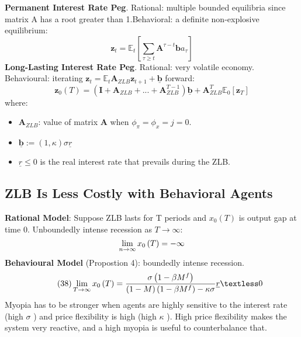 \documentclass{beamer}
\begin{document}
\begin{frame}{\subsecname}
    \textbf{Permanent Interest Rate Peg}. Rational: multiple bounded equilibria since matrix A has a root greater than 1.Behavioral: a definite non-explosive equilibrium:
    \begin{equation}
        \textbf{z}_{t}=\mathbb{E}_{t}\left[\sum_{\tau \geq t}\textbf{A}^{\tau-t}\textbf{b}a_{\tau}\right]
    \end{equation}
    \textbf{Long-Lasting Interest Rate Peg}. Rational: very volatile economy. Behavioural: iterating $\textbf{z}_{t}=\mathbb{E}_{t}\textbf{A}_{ZLB}\textbf{z}_{t+1}+\underline{\textbf{b}}$ forward:
    \begin{equation}\tag{36}
        \textbf{z}_{0}(T)=\left(\textbf{I}+\textbf{A}_{ZLB}+...+\textbf{A}_{ZLB}^{T-1}\right)\underline{\textbf{b}}+\textbf{A}_{ZLB}^{T}\mathbb{E}_{0}\left[\textbf{z}_{T}\right]
    \end{equation}
    where:
    \begin{itemize}
        \item $\textbf{A}_{ZLB}$: value of matrix $\textbf{A}$  when $\phi_{\pi}=\phi_{x}=j=0$.
        \item $\underline{\textbf{b}}:=\left(1,\kappa\right)\sigma\underline{r}$
        \item $\underline{r}\leq 0$ is the real interest rate that prevails during the ZLB.
    \end{itemize}
\end{frame}

\subsection{ZLB Is Less Costly with Behavioral Agents}

\begin{frame}{\subsecname}
    \textbf{Rational Model}: Suppose ZLB lasts for T periods and $x_{0}\left(T\right)$ is output gap at time 0. Unboundedly intense recession as $T\to\infty$:
    \begin{equation}\notag
        \lim\limits_{n\to\infty}x_{0}\left(T\right)=-\infty
    \end{equation}
    \textbf{Behavioural Model} (Propostion 4): boundedly intense recession.
    \begin{equation}\tag{38}    \lim\limits_{T\to\infty}x_{0}\left(T\right)=\frac{\sigma\left(1-\beta M^{f}\right)}{\left(1-M\right)\left(1-\beta M^{f}\right)-\kappa\sigma}\underline{r}\textless 0
    \end{equation}
    Myopia has to be stronger when agents are highly sensitive to the interest rate (high $\sigma$ ) and price flexibility is high (high $\kappa$ ). High price flexibility makes the system very reactive, and a high myopia is useful to counterbalance that.
\end{frame}
\end{document}
